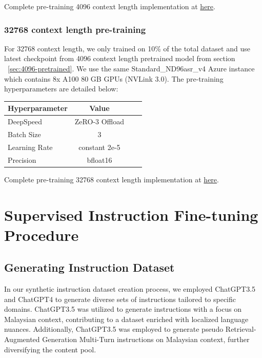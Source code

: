 \documentclass[preprint]{article}
\begin{document}
Complete pre-training 4096 context length implementation at \href{https://github.com/mesolitica/malaya/tree/5.1/session/mistral#7b-4096-context-length}{here}.

\subsubsection{32768 context length pre-training}\label{sec:32768-pretrained}

For 32768 context length, we only trained on 10\% of the total dataset and use latest checkpoint from 4096 context length pretrained model from section ~\ref{sec:4096-pretrained}. We use the same Standard\_ND96asr\_v4 Azure instance which contains 8x A100 80 GB GPUs (NVLink 3.0). The pre-training hyperparameters are detailed below:

\begin{table}[h]
  \centering
  \begin{tabular}{lccl}
    \hline
    \textbf{Hyperparameter} & \textbf{Value} \\
    \hline
    DeepSpeed               & ZeRO-3 Offload \\
    Batch Size              & 3              \\
    Learning Rate           & constant 2e-5  \\
    Precision               & bfloat16       \\
    \hline
  \end{tabular}
\end{table}

Complete pre-training 32768 context length implementation at \href{https://github.com/mesolitica/malaya/tree/5.1/session/mistral#7b-32768-context-length}{here}.


\section{Supervised Instruction Fine-tuning Procedure}

\subsection{Generating Instruction Dataset}\label{sec:generating-instruction-dataset}

In our synthetic instruction dataset creation process, we employed ChatGPT3.5 and ChatGPT4 to generate diverse sets of instructions tailored to specific domains. ChatGPT3.5 was utilized to generate instructions with a focus on Malaysian context, contributing to a dataset enriched with localized language nuances. Additionally, ChatGPT3.5 was employed to generate pseudo Retrieval-Augmented Generation Multi-Turn instructions on Malaysian context, further diversifying the content pool.
\end{document}
